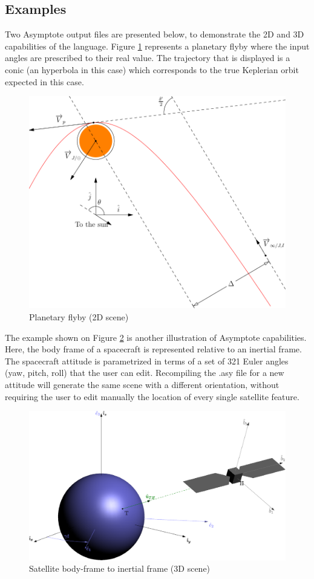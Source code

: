 \documentclass{report}
\begin{document}
\subsection{Examples}
Two Asymptote output files are presented below, to demonstrate the 2D and 3D capabilities of the language. Figure \ref{fig:flyby} represents a planetary flyby where the input angles are prescribed to their real value. The trajectory that is displayed is a conic (an hyperbola in this case) which corresponds to the true Keplerian orbit expected in this case.
\begin{figure}[H]
\centering
\includegraphics[scale=0.6]{flyby.pdf}
\caption{Planetary flyby (2D scene)}
\label{fig:flyby}
\end{figure}
The example shown on Figure \ref{fig:ECI_to_body} is another illustration of Asymptote capabilities. Here, the body frame of a spacecraft is represented relative to an inertial frame. The spacecraft attitude is parametrized in terms of a set of 321 Euler angles (yaw, pitch, roll) that the user can edit. Recompiling the .asy file for a new attitude will generate the same scene with a different orientation, without requiring the user to edit manually the location of every single satellite feature.
\begin{figure}
\centering
\includegraphics[scale=0.5]{ECI_to_body.pdf}
\caption{Satellite body-frame to inertial frame (3D scene)}
\label{fig:ECI_to_body}
\end{figure}
\end{document}
